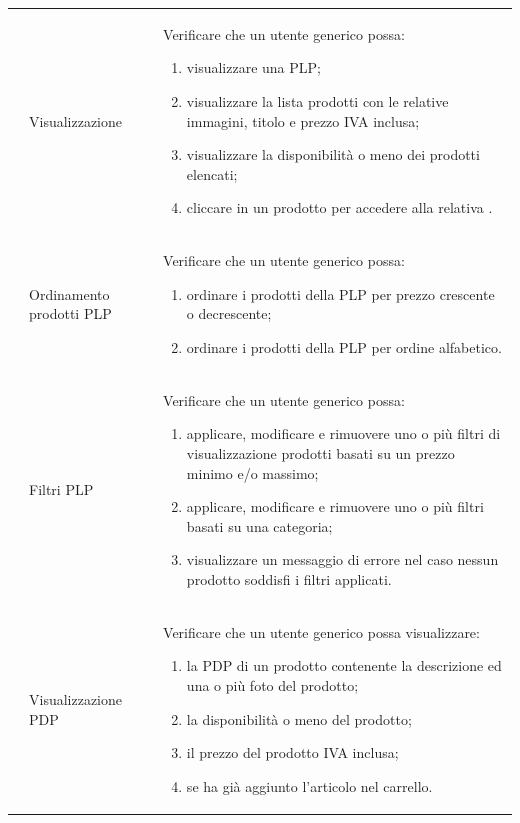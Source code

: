 \begin{center}
\begin{longtable}{|p{1cm}|p{4.85cm}|p{9cm}|}
		 & Visualizzazione \glock{PLP} & Verificare che un utente generico possa: 
		\begin{enumerate}
			\item  visualizzare una PLP;
			\item  visualizzare la lista prodotti con le relative immagini, titolo e prezzo IVA inclusa;
			\item  visualizzare la disponibilità o meno dei prodotti elencati;
			\item  cliccare in un prodotto per accedere alla relativa \glock{PDP}.
		\end{enumerate} \\

		 & Ordinamento prodotti PLP & Verificare che un utente generico possa: 
		\begin{enumerate}
			\item  ordinare i prodotti della PLP per prezzo crescente o decrescente;
			\item  ordinare i prodotti della PLP per ordine alfabetico.
		\end{enumerate} \\

		 & Filtri PLP & Verificare che un utente generico possa: 
		\begin{enumerate}
			\item  applicare, modificare e rimuovere uno o più filtri di visualizzazione prodotti basati su un prezzo minimo e/o massimo;
			\item  applicare, modificare e rimuovere uno o più filtri basati su una categoria;
			\item  visualizzare un messaggio di errore nel caso nessun prodotto soddisfi i filtri applicati.
		\end{enumerate} \\

		 & Visualizzazione PDP & Verificare che un utente generico possa visualizzare: 
		\begin{enumerate}
			\item   la PDP di un prodotto contenente la descrizione ed una o più foto del prodotto;
			\item   la disponibilità o meno del prodotto;
			\item   il prezzo del prodotto IVA inclusa;
			\item   se ha già aggiunto l'articolo nel carrello.
		\end{enumerate} \\


\end{longtable}
\end{center}
